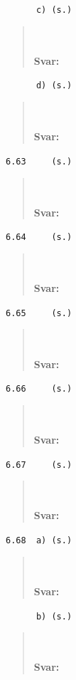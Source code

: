 \documentclass[a4paper]{article}
\newcommand{\tskcol}[1]{\textcolor{tskcol}{#1}}
\begin{document}
	\texttt{\tskcol{~~~~~~c) (s.)}}
	\begin{quotation}
		\noindent
		\\ \\
		\textbf{Svar:}
	\end{quotation}
	
	\texttt{\tskcol{~~~~~~d) (s.)}}
	\begin{quotation}
		\noindent
		\\ \\
		\textbf{Svar:}
	\end{quotation}
	
	\texttt{\tskcol{6.63~~~~ (s.)}}
	\begin{quotation}
		\noindent
		\\ \\
		\textbf{Svar:}
	\end{quotation}
	
	\texttt{\tskcol{6.64~~~~ (s.)}}
	\begin{quotation}
		\noindent
		\\ \\
		\textbf{Svar:}
	\end{quotation}
	
	\texttt{\tskcol{6.65~~~~ (s.)}}
	\begin{quotation}
		\noindent
		\\ \\
		\textbf{Svar:}
	\end{quotation}
	
	\texttt{\tskcol{6.66~~~~ (s.)}}
	\begin{quotation}
		\noindent
		\\ \\
		\textbf{Svar:}
	\end{quotation}
	
	\texttt{\tskcol{6.67~~~~ (s.)}}
	\begin{quotation}
		\noindent
		\\ \\
		\textbf{Svar:}
	\end{quotation}
	
	\texttt{\tskcol{6.68~~a) (s.)}}
	\begin{quotation}
		\noindent
		\\ \\
		\textbf{Svar:}
	\end{quotation}
	
	\texttt{\tskcol{~~~~~~b) (s.)}}
	\begin{quotation}
		\noindent
		\\ \\
		\textbf{Svar:}
	\end{quotation}
	
\end{document}
